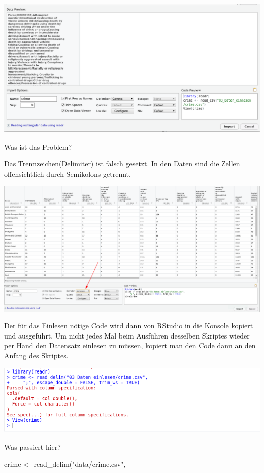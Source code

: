 \documentclass[
]{book}
\newenvironment{Shaded}{\begin{snugshade}}{\end{snugshade}}
\newcommand{\FunctionTok}[1]{\textcolor[rgb]{0.00,0.00,0.00}{#1}}
\newcommand{\NormalTok}[1]{#1}
\newcommand{\OtherTok}[1]{\textcolor[rgb]{0.56,0.35,0.01}{#1}}
\newcommand{\StringTok}[1]{\textcolor[rgb]{0.31,0.60,0.02}{#1}}
\begin{document}
\begin{center}\includegraphics[width=0.8\linewidth]{imgs/text} \end{center}

Was ist das Problem?

Das Trennzeichen(Delimiter) ist falsch gesetzt. In den Daten sind die Zellen offensichtlich durch Semikolons getrennt.

\begin{center}\includegraphics[width=0.8\linewidth]{imgs/text2} \end{center}

Der für das Einlesen nötige Code wird dann von RStudio in die Konsole kopiert und ausgeführt.
Um nicht jedes Mal beim Ausführen desselben Skriptes wieder per Hand den Datensatz einlesen zu müssen, kopiert man den Code dann an den Anfang des Skriptes.

\begin{center}\includegraphics[width=0.8\linewidth]{imgs/text3} \end{center}

Was passiert hier?

\begin{Shaded}
\begin{Highlighting}[]
\NormalTok{crime }\OtherTok{\textless{}{-}} \FunctionTok{read\_delim}\NormalTok{(}\StringTok{"data/crime.csv"}\NormalTok{, }
\end{Highlighting}
\end{Shaded}
\end{document}
